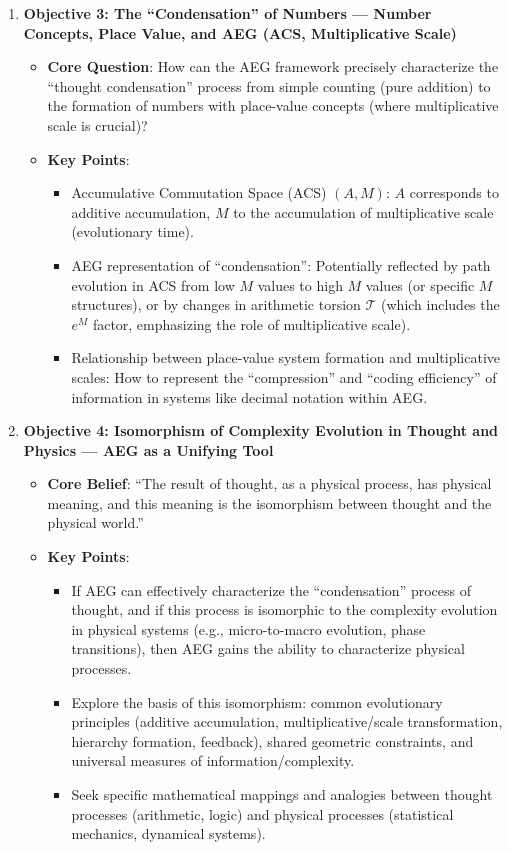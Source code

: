 \documentclass[12pt]{article}
\begin{document}
\begin{enumerate}
    \item \textbf{Objective 3: The ``Condensation'' of Numbers --- Number Concepts, Place Value, and AEG (ACS, Multiplicative Scale)}
    \begin{itemize}
        \item \textbf{Core Question}: How can the AEG framework precisely characterize the ``thought condensation'' process from simple counting (pure addition) to the formation of numbers with place-value concepts (where multiplicative scale is crucial)?
        \item \textbf{Key Points}:
        \begin{itemize}
            \item Accumulative Commutation Space (ACS) $(A,M)$: $A$ corresponds to additive accumulation, $M$ to the accumulation of multiplicative scale (evolutionary time).
            \item AEG representation of ``condensation'': Potentially reflected by path evolution in ACS from low $M$ values to high $M$ values (or specific $M$ structures), or by changes in arithmetic torsion $\mathcal{T}$ (which includes the $e^M$ factor, emphasizing the role of multiplicative scale).
            \item Relationship between place-value system formation and multiplicative scales: How to represent the ``compression'' and ``coding efficiency'' of information in systems like decimal notation within AEG.
        \end{itemize}
    \end{itemize}

    \item \textbf{Objective 4: Isomorphism of Complexity Evolution in Thought and Physics --- AEG as a Unifying Tool}
    \begin{itemize}
        \item \textbf{Core Belief}: ``The result of thought, as a physical process, has physical meaning, and this meaning is the isomorphism between thought and the physical world.''
        \item \textbf{Key Points}:
        \begin{itemize}
            \item If AEG can effectively characterize the ``condensation'' process of thought, and if this process is isomorphic to the complexity evolution in physical systems (e.g., micro-to-macro evolution, phase transitions), then AEG gains the ability to characterize physical processes.
            \item Explore the basis of this isomorphism: common evolutionary principles (additive accumulation, multiplicative/scale transformation, hierarchy formation, feedback), shared geometric constraints, and universal measures of information/complexity.
            \item Seek specific mathematical mappings and analogies between thought processes (arithmetic, logic) and physical processes (statistical mechanics, dynamical systems).
        \end{itemize}
    \end{itemize}
\end{enumerate}
\end{document}
